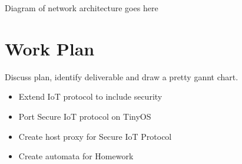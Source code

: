 \documentclass{mprop}
\begin{document}
Diagram of network architecture goes here
\section{Work Plan}
Discuss plan, identify deliverable and draw a pretty gannt chart.
\begin{itemize}
  \item Extend IoT protocol to include security 
  \item Port Secure IoT protocol on TinyOS
  \item Create host proxy for Secure IoT Protocol
  \item Create automata for Homework
\end{itemize}



\end{document}
